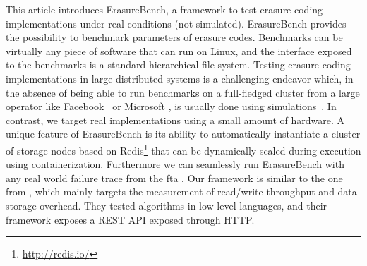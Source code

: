 



This article introduces ErasureBench, a framework to test erasure coding implementations under real conditions (not simulated). ErasureBench provides the possibility to benchmark parameters of erasure codes. Benchmarks can be virtually any piece of software that can run on Linux, and the interface exposed to the benchmarks is a standard hierarchical file system. Testing erasure coding implementations in large distributed systems is a challenging endeavor which, in the absence of being able to run benchmarks on a full-fledged cluster from a large operator like Facebook~\autocite{XorbasVLDB} or Microsoft \cite{DBLP:conf/usenix/HuangSXOCG0Y12}, is usually done using simulations~\autocite{Silberstein2014}. In contrast, we target real implementations using a small amount of hardware. A unique feature of ErasureBench is its ability to automatically instantiate a cluster of storage nodes based on Redis\footnote{\url{http://redis.io/}} that can be dynamically scaled during execution using containerization. Furthermore we can seamlessly run ErasureBench with any real world failure trace from the \ac{fta} \autocite{fta-journal,fta-paper}. 
Our framework is similar to the one from \autocite{Burihabwa2016}, which mainly targets
the measurement of read/write throughput and data storage overhead. They tested algorithms in low-level languages, and their framework exposes a REST API exposed through HTTP.

